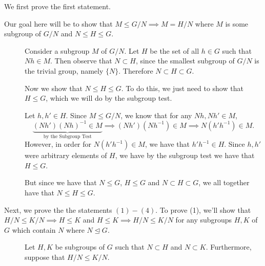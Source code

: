 \documentclass[12pt,letterpaper]{algebra_book}
\newcommand{\normal}{\unlhd}
\theoremstyle{definition}
\begin{document}
    \begin{prf}
        We first prove the first statement.

        \textcolor{NavyBlue}{Our goal here will be to show that $M \le
        G/N \implies M = H/N$ where $M$ is some subgroup of $G/N$ and
        $N \le H \le G$.} 
        \begin{description}
            \item[\phantom{1}]
            \hspace{0.5cm} Consider a subgroup $M$
            of $G/N$. Let $H$ be the set of all $h \in G$ such that
            $Nh \in M$. Then observe that $N \subset H$, since the smallest
            subgroup of $G/N$ is the trivial group, namely $\{N\}$.
            Therefore $N \subset H \subset G$.
            
            \textcolor{NavyBlue}{Now we
            show that $N \le H \le G$. To do this, we just need to
            show that $H \le G$, which we will do by the subgroup test.}

            Let $h, h' \in H$. Since $M \le G/N$, we know that for any
            $Nh, Nh' \in M$,  
            \[
                \underbrace{(Nh')(Nh)^{-1} \in M}_{\text{by the Subgroup Test}} \implies (Nh')(Nh^{-1}) \in M 
                \implies N(h'h^{-1}) \in M.
            \]
            However, in order for $N(h' h^{-1}) \in M$, we have that
            $h'h^{-1} \in H$. Since $h, h'$ were arbitrary elements of
           $H$, we have by the subgroup test we have that
            $H \le G$.  
            
            But since we have that $N \le G$, $H \le G$ and $N \subset
            H \subset G$, we all together have that $N \le H \le G$. 
        \end{description}
        Next, we prove the the statements $(1)-(4).$
        \textcolor{NavyBlue}{To prove (1), we'll show that $H/N \le K/N \implies H \le K$
        and $H \le K \implies H/N \le K/N$ for any subgroups $H, K$ of
        $G$ which contain $N$ where $N \normal G$.}

        \begin{description}
            \item[\phantom{1}]
            \hspace{0.5cm} Let $H, K$ be subgroups of $G$ such that $N
            \subset H$ and $N \subset K$. Furthermore, suppose that 
            $H/N \le K/N$.
            
        \end{description}
    \end{prf}
\end{document}
